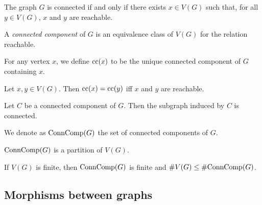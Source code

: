 \begin{lemma}
  \label{lem:connected_iff_exists_forall_reachable}
  The graph $G$ is connected if and only if there exists $x \in V(G)$ such that,
  for all $y \in V(G)$, $x$ and $y$ are reachable.
\end{lemma}

\begin{definition}
  \label{def:connected_component}
  A \emph{connected component} of $G$ is an equivalence class of $V(G)$ for
  the relation reachable.
\end{definition}

\begin{definition}
  \label{def:connected_component_Mk}
  For any vertex $x$, we define $\mathrm{cc}(x)$ to be the unique connected component
  of $G$ containing $x$.
\end{definition}

\begin{lemma}
  \label{lem:cc_eq}
  Let $x, y \in V(G)$. Then $\mathrm{cc}(x) = \mathrm{cc}(y)$ iff $x$ and $y$ are reachable.
\end{lemma}

\begin{theorem}
  \label{thm:cc_is_connected}
  Let $C$ be a connected component of $G$. Then the subgraph induced by $C$ is connected.
\end{theorem}

\begin{definition}
  \label{def:set_cc}
  We denote as $\mathrm{ConnComp}(G)$ the set of connected components of $G$.
\end{definition}

\begin{proposition}
  \label{prop:cc_is_partition}
  $\mathrm{ConnComp}(G)$ is a partition of $V(G)$.
\end{proposition}

\begin{lemma}
  \label{lem:bound_cc}
  If $V(G)$ is finite, then $\mathrm{ConnComp}(G)$ is finite and $\#V(G) \leq \# \mathrm{ConnComp}(G)$.
\end{lemma}

\subsection{Morphisms between graphs}

